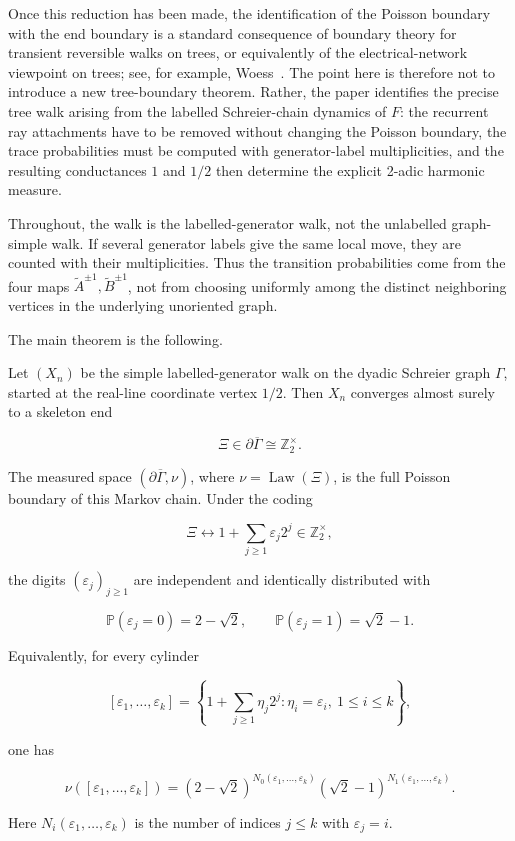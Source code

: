 \documentclass[11pt,a4paper]{scrartcl}
\begin{document}
Once this reduction has been made, the identification of the Poisson boundary
with the end boundary is a standard consequence of boundary theory for
transient reversible walks on trees, or equivalently of the electrical-network
viewpoint on trees; see, for example, Woess~\cite{Woess2000,Woess2009}. The
point here is therefore not to introduce a new tree-boundary theorem. Rather,
the paper identifies the precise tree walk arising from the labelled
Schreier-chain dynamics of \(F\): the recurrent ray attachments have to be
removed without changing the Poisson boundary, the trace probabilities must be
computed with generator-label multiplicities, and the resulting conductances
\(1\) and \(1/2\) then determine the explicit 2-adic harmonic measure.

Throughout, the walk is the labelled-generator walk, not the unlabelled
graph-simple walk. If several generator labels give the same local move, they
are counted with their multiplicities. Thus the transition probabilities come
from the four maps
\(\widetilde A^{\pm1},\widetilde B^{\pm1}\), not from choosing uniformly among
the distinct neighboring vertices in the underlying unoriented graph.

The main theorem is the following.

\begin{mainthm}\label{thm:main}
Let \((X_n)\) be the simple labelled-generator walk on the dyadic
Schreier graph \(\Gamma\), started at the real-line coordinate vertex
\(1/2\). Then \(X_n\) converges almost surely to a skeleton end

\[
\Xi\in \partial\overline\Gamma\cong \mathbb Z_2^\times .
\]

The measured space \((\partial\overline\Gamma,\nu)\), where
\(\nu=\operatorname{Law}(\Xi)\), is the full Poisson boundary of this Markov
chain. Under the coding

\[
\Xi
\leftrightarrow
1+\sum_{j\ge 1}\varepsilon_j2^j
\in \mathbb Z_2^\times ,
\]

the digits \((\varepsilon_j)_{j\ge 1}\) are independent and identically
distributed with

\[
\mathbb P(\varepsilon_j=0)=2-\sqrt2,
\qquad
\mathbb P(\varepsilon_j=1)=\sqrt2-1 .
\]

Equivalently, for every cylinder

\[
[\varepsilon_1,\ldots,\varepsilon_k]
=
\left\{
1+\sum_{j\ge 1}\eta_j2^j:
\eta_i=\varepsilon_i,\ 1\le i\le k
\right\},
\]

one has

\[
\nu([\varepsilon_1,\ldots,\varepsilon_k])
=
(2-\sqrt2)^{N_0(\varepsilon_1,\ldots,\varepsilon_k)}
(\sqrt2-1)^{N_1(\varepsilon_1,\ldots,\varepsilon_k)} .
\]

Here \(N_i(\varepsilon_1,\ldots,\varepsilon_k)\) is the number of indices
\(j\le k\) with \(\varepsilon_j=i\).

\end{mainthm}
\end{document}
